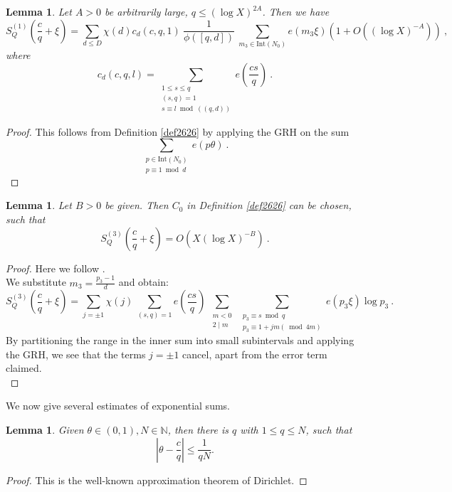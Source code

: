 \documentclass{amsart}
\newtheorem{lemma}[theorem]{Lemma}
\numberwithin{equation}{subsection}
\begin{document}
\begin{lemma}\label{lem57}
Let $A>0$ be arbitrarily large, $q\leq (\log X)^{2A}$. Then we have
$$S_Q^{(1)}\left(\frac{c}{q}+\xi\right)=\sum_{d\leq D} \chi(d) c_d(c,q,1)\:\frac{1}{\phi([q,d])}\: \sum_{m_3\in \text{Int}(N_0)} e(m_3\xi)\left(1+O\left((\log X)^{-A}\right)\right)\:,$$
where
$$c_d(c,q,l)=\sum_{\substack{1\leq s\leq q \\ (s,q)=1 \\ s\equiv l \bmod ((q,d))  }} e\left(\frac{cs}{q}\right)\:.$$
\end{lemma} 
\begin{proof}
This follows from Definition \ref{def2626} by applying the GRH on the sum
$$\sum_{\substack{p\in \text{Int}(N_0) \\ p\equiv 1\bmod d }} e(p\theta)\:.$$
\end{proof}

\begin{lemma}\label{lem58}
Let $B>0$ be given. Then $C_0$ in Definition \ref{def2626} can be chosen, such that 
$$S_Q^{(3)}\left(\frac{c}{q}+\xi\right)=O\left(X(\log X)^{-B}\right)\:.$$
\end{lemma}
\begin{proof}
Here we follow \cite{maier-rassias-gold}.\\
We substitute $m_3=\frac{p_3-1}{d}$ and obtain:
$$S_Q^{(3)}\left(\frac{c}{q}+\xi\right)=\sum_{j=\pm 1} \chi(j)\: \sum_{(s,q)=1} e\left(\frac{cs}{q}\right)\ \sum_{\substack{m<0 \\ 2\mid m}}\ \sum_{\substack{p_3 \equiv s \bmod q \\ p_3 \equiv 1+jm(\bmod 4m)  }}  e(p_3\xi) \log p_3\:.$$
By partitioning the range in the inner sum into small subintervals and applying the GRH, we see that the terms $j=\pm 1$ cancel, apart from the error term claimed.\\
\end{proof}


We now give several estimates of exponential sums.
\begin{lemma}\label{lem59*}
Given $\theta\in(0,1), N\in\mathbb{N}$, then there is $q$ with $1\leq q\leq N$, such that 
$$\left| \theta-\frac{c}{q} \right|\leq \frac{1}{qN}.$$
\end{lemma}
\begin{proof}
This is the well-known approximation theorem of Dirichlet.
\end{proof}
\end{document}
